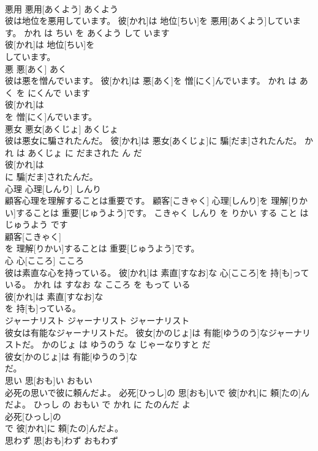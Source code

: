 \documentclass[8pt]{extreport}
\begin{document}
\begin{CJK}{UTF8}{min}
\\	悪用	悪用[あくよう]	あくよう	
\\	彼は地位を悪用しています。	彼[かれ]は 地位[ちい]を 悪用[あくよう]しています。	かれ は ちい を あくよう して います	
\\	彼[かれ]は 地位[ちい]を
\\	しています。			
\\	悪	悪[あく]	あく	
\\	彼は悪を憎んでいます。	彼[かれ]は 悪[あく]を 憎[にく]んでいます。	かれ は あく を にくんで います	
\\	彼[かれ]は
\\	を 憎[にく]んでいます。			
\\	悪女	悪女[あくじょ]	あくじょ	
\\	彼は悪女に騙されたんだ。	彼[かれ]は 悪女[あくじょ]に 騙[だま]されたんだ。	かれ は あくじょ に だまされた ん だ	
\\	彼[かれ]は
\\	に 騙[だま]されたんだ。			
\\	心理	心理[しんり]	しんり	
\\	顧客心理を理解することは重要です。	顧客[こきゃく] 心理[しんり]を 理解[りかい]することは 重要[じゅうよう]です。	こきゃく しんり を りかい する こと は じゅうよう です	
\\	顧客[こきゃく]
\\	を 理解[りかい]することは 重要[じゅうよう]です。			
\\	心	心[こころ]	こころ	
\\	彼は素直な心を持っている。	彼[かれ]は 素直[すなお]な 心[こころ]を 持[も]っている。	かれ は すなお な こころ を もって いる	
\\	彼[かれ]は 素直[すなお]な
\\	を 持[も]っている。			
\\	ジャーナリスト	ジャーナリスト	ジャーナリスト	
\\	彼女は有能なジャーナリストだ。	彼女[かのじょ]は 有能[ゆうのう]なジャーナリストだ。	かのじょ は ゆうのう な じゃーなりすと だ	
\\	彼女[かのじょ]は 有能[ゆうのう]な
\\	だ。			
\\	思い	思[おも]い	おもい	
\\	必死の思いで彼に頼んだよ。	必死[ひっし]の 思[おも]いで 彼[かれ]に 頼[たの]んだよ。	ひっし の おもい で かれ に たのんだ よ	
\\	必死[ひっし]の
\\	で 彼[かれ]に 頼[たの]んだよ。			
\\	思わず	思[おも]わず	おもわず	

\end{CJK}
\end{document}
